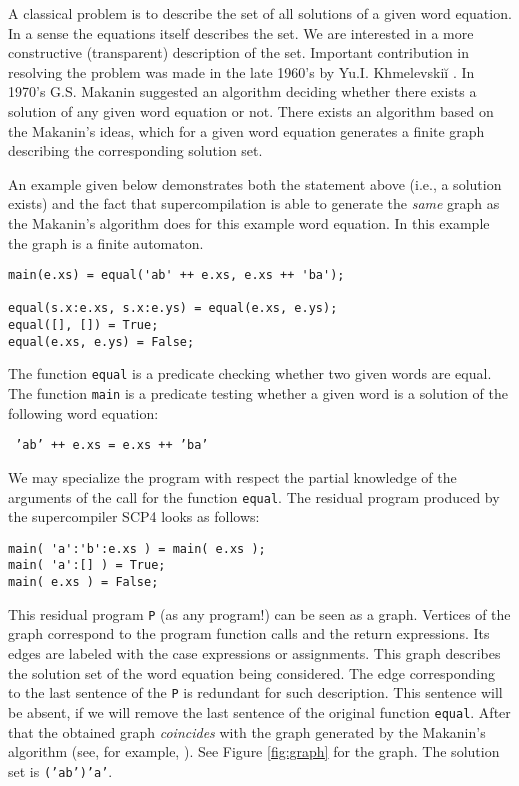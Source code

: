 \documentclass[preprint]{sigplanconf}
\begin{document}
A classical problem is to describe the set of all solutions of a given word equation. In a sense the equations itself describes the set. We are interested in a more constructive (transparent) description of the set.  
Important contribution in resolving the problem was made in the late 1960's by Yu.I. Khmelevski\u{i} \cite{Khmelevskii:77}.  In 1970's G.S. Makanin \cite{Makanin:77} suggested an algorithm deciding whether there exists a solution of any given word equation or not. There exists an algorithm based on the Makanin's ideas, which for a given word equation generates a finite graph describing the corresponding solution set. 

An example given below demonstrates both the statement above 
(i.e., a solution exists)
and the fact that supercompilation is able to generate the \emph{same} graph as the Makanin's algorithm does for this example word equation. 
In this example the graph is a finite automaton. 

\noindent
\begin{verbatim}
main(e.xs) = equal('ab' ++ e.xs, e.xs ++ 'ba');

equal(s.x:e.xs, s.x:e.ys) = equal(e.xs, e.ys);
equal([], []) = True;
equal(e.xs, e.ys) = False;
\end{verbatim}

The function \texttt{equal} is a predicate checking  whether two given words are equal.  The function \texttt{main} is a predicate testing whether a given word is a solution of the following word equation:


\begin{center}
\texttt{
'ab' ++ e.xs = e.xs ++ 'ba'
}
\end{center}

We may specialize the program with respect the partial knowledge of the arguments of the call for the function \texttt{equal}. The residual program produced by the supercompiler SCP4 looks as follows:

\noindent
\begin{verbatim}
main( 'a':'b':e.xs ) = main( e.xs );
main( 'a':[] ) = True;
main( e.xs ) = False;
\end{verbatim}

This residual program \texttt{P} (as any program!) can be seen as a graph. 
Vertices of the graph correspond to the program function calls and the return expressions. Its edges are labeled with the case expressions or assignments. This graph describes the solution set of the word equation being considered. The edge corresponding to the last sentence of the \texttt{P} is redundant for such description. This sentence will be absent, if we will remove the last sentence of the original function \texttt{equal}. After that the obtained graph \emph{coincides} with the graph generated by the Makanin's algorithm (see, for example, \cite{Diekert02}). See Figure \ref{fig:graph} for the graph. The solution set is \texttt{('ab')'a'}.
\end{document}

